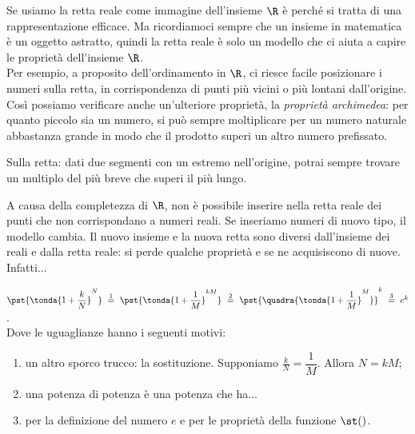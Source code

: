 Se usiamo la retta reale come immagine dell'insieme \(\R\) è perché
si tratta di una rappresentazione efficace. Ma ricordiamoci sempre che un 
insieme in matematica è un oggetto astratto, quindi la retta reale è solo
un modello che ci aiuta a capire le proprietà dell'insieme \(\R\).\\
Per esempio, a proposito dell'ordinamento in \(\R\), ci riesce facile
posizionare i numeri sulla retta, in corrispondenza di punti più vicini o 
più lontani dall'origine. 
Così possiamo verificare anche un'ulteriore proprietà, 
la \emph{proprietà archimedea}: per quanto piccolo sia un numero, si 
può sempre moltiplicare per un numero naturale abbastanza grande in modo 
che il prodotto superi un altro numero prefissato.

Sulla retta: dati due segmenti con un estremo nell'origine, potrai sempre 
trovare un  multiplo del più breve che superi il più lungo.

A causa della completezza di \(\R\), non è possibile inserire
nella retta reale dei punti che non corrispondano a numeri reali. Se 
inseriamo numeri di nuovo tipo, il modello cambia. Il nuovo insieme e la 
nuova retta sono diversi dall'insieme dei reali e dalla retta reale: si 
perde qualche proprietà e se ne acquisiscono di nuove.
Infatti...




\begin{esempio}
\(\pst{\tonda{1+\dfrac{k}{N}}^N}
~ \stackrel{1}{=} ~  
\pst{\tonda{1+\dfrac{1}{M}}^{kM}}
~ \stackrel{2}{=} ~
\pst{\quadra{\tonda{1+\dfrac{1}{M}}^M}}^k
~ \stackrel{3}{=} ~ e^k\).\\

Dove le uguaglianze hanno i seguenti motivi:
\begin{enumerate} [nosep]
 \item un altro sporco trucco: la sostituzione. Supponiamo
\(\frac{k}{N}=\dfrac{1}{M}\). Allora \(N=kM\);
 \item una potenza di potenza è una potenza che ha...
 \item per la definizione del numero \(e\) e per le proprietà della funzione 
\(\st()\).
\end{enumerate}
\end{esempio}

